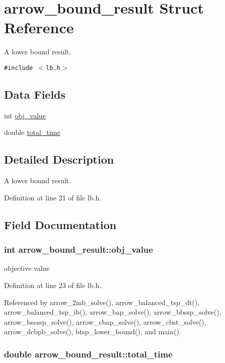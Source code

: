 \hypertarget{structarrow__bound__result}{
\section{arrow\_\-bound\_\-result Struct Reference}
\label{structarrow__bound__result}
}
A lower bound result.  


{\tt \#include $<$lb.h$>$}

\subsection*{Data Fields}
\begin{CompactItemize}
\item 
int \hyperlink{structarrow__bound__result_acbca68de984376a60dbb9893935e0f4}{obj\_\-value}
\item 
double \hyperlink{structarrow__bound__result_d27a3cae43bbe1ed2e2c60a4ef307b08}{total\_\-time}
\end{CompactItemize}


\subsection{Detailed Description}
A lower bound result. 

Definition at line 21 of file lb.h.

\subsection{Field Documentation}
\hypertarget{structarrow__bound__result_acbca68de984376a60dbb9893935e0f4}{
\subsubsection[{obj\_\-value}]{\setlength{\rightskip}{0pt plus 5cm}int {\bf arrow\_\-bound\_\-result::obj\_\-value}}}
\label{structarrow__bound__result_acbca68de984376a60dbb9893935e0f4}


objective value 

Definition at line 23 of file lb.h.

Referenced by arrow\_\-2mb\_\-solve(), arrow\_\-balanced\_\-tsp\_\-dt(), arrow\_\-balanced\_\-tsp\_\-ib(), arrow\_\-bap\_\-solve(), arrow\_\-bbssp\_\-solve(), arrow\_\-bscssp\_\-solve(), arrow\_\-cbap\_\-solve(), arrow\_\-cbst\_\-solve(), arrow\_\-dcbpb\_\-solve(), btsp\_\-lower\_\-bound(), and main().\hypertarget{structarrow__bound__result_d27a3cae43bbe1ed2e2c60a4ef307b08}{
\subsubsection[{total\_\-time}]{\setlength{\rightskip}{0pt plus 5cm}double {\bf arrow\_\-bound\_\-result::total\_\-time}}}
\label{structarrow__bound__result_d27a3cae43bbe1ed2e2c60a4ef307b08}


